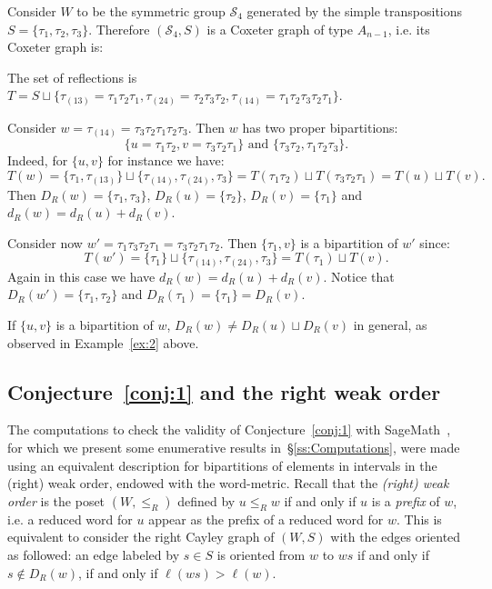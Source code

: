 \documentclass[Unicode]{cedram-alco}
\theoremstyle{definition}
\begin{document}
\begin{ex}\label{ex:2} Consider $W$ to be the symmetric group $\mathcal S_4$  generated by the simple transpositions $S=\{\tau_1,\tau_2,\tau_3\}$. Therefore $(\mathcal S_4,S)$ is a Coxeter graph of type $A_{n-1}$, i.e. its  Coxeter graph is:
\begin{center}
\end{center}
The set of reflections is $T=S\sqcup\{\tau_{(13)}=\tau_1\tau_2\tau_1,\tau_{(24)}=\tau_2\tau_3\tau_2,\tau_{(14)}=\tau_1\tau_2\tau_3\tau_2\tau_1\}$. 

Consider $w=\tau_{(14)}=\tau_3\tau_2\tau_1\tau_2\tau_3$. Then $w$ has two proper bipartitions:  
$$
\{u=\tau_1\tau_2,v=\tau_3\tau_2\tau_1\}\textrm{ and }\{\tau_3\tau_2,\tau_1\tau_2\tau_3\}.
$$ 
Indeed, for $\{u,v\}$ for instance we have:
$$
T(w)=\{\tau_1, \tau_{(13)}\}\sqcup\{\tau_{(14)},\tau_{(24)},\tau_{3}\}=T(\tau_1\tau_2)\sqcup T(\tau_3\tau_2\tau_1)=T(u)\sqcup T(v).
$$
Then $D_R(w)=\{\tau_1,\tau_3\}$, $D_R(u)=\{\tau_2\}$, $D_R(v)=\{\tau_1\}$ and $d_R(w)=d_R(u)+d_R(v)$.

Consider now $w'=\tau_1\tau_3\tau_2\tau_1=\tau_3\tau_2\tau_1\tau_2$. Then $\{\tau_1,v\}$ is a bipartition of $w'$ since:
$$
T(w')=\{\tau_1\}\sqcup\{\tau_{(14)},\tau_{(24)},\tau_{3}\}=T(\tau_1)\sqcup T(v).
$$
Again in this case we have $d_R(w)=d_R(u)+d_R(v)$. Notice that $D_R(w')=\{\tau_1,\tau_2\}$ and $D_R(\tau_1)=\{\tau_1\}=D_R(v)$.
\end{ex}

\begin{remark} If $\{u,v\}$ is a bipartition of $w$,  $D_R(w)\not = D_R(u)\sqcup D_R(v)$ in general, as observed in Example~\ref{ex:2} above. 
\end{remark}


\subsection{Conjecture~\ref{conj:1} and the right weak order}\label{ss:Weak}   The computations to check the validity of Conjecture~\ref{conj:1} with SageMath~\cite{sage}, for which we present some enumerative results in~\S\ref{ss:Computations},  were made using an equivalent description for bipartitions of elements  in intervals in the (right) weak order, endowed with the word-metric. Recall that the {\em (right) weak order} is the poset $(W,\leq_R)$  defined by $u\leq_R w$ if and only if $u$ is a {\em prefix} of $w$, i.e. a reduced word for $u$ appear as the prefix of a reduced word for $w$. This is equivalent to consider the right Cayley graph of $(W,S)$ with the edges oriented as followed: an edge labeled by $s\in S$ is oriented from $w$ to $ws$ if and only if $s\notin D_R(w)$, if and only if $\ell(ws)>\ell(w)$. 
\end{document}
